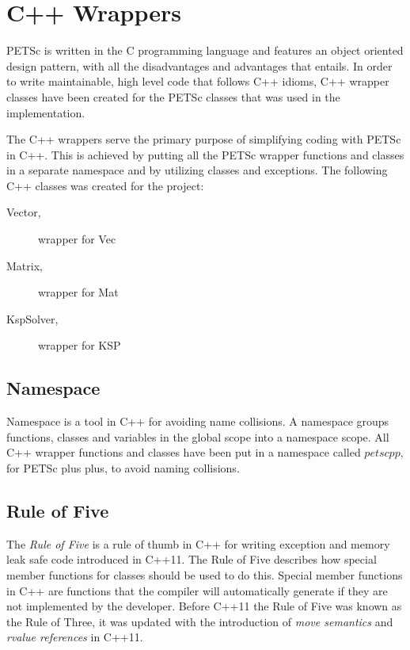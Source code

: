 \section{C++ Wrappers}

PETSc is written in the C programming language and features an object oriented
design pattern, with all the disadvantages and advantages that entails. In order
to write maintainable, high level code that follows C++ idioms, C++ wrapper
classes have been created for the PETSc classes that was used in the
implementation.

The C++ wrappers serve the primary purpose of simplifying coding with PETSc in
C++. This is achieved by putting all the PETSc wrapper functions and classes in
a separate namespace and by utilizing classes and exceptions. The following C++
classes was created for the project:
\begin{description}
	\item[Vector,] wrapper for Vec
	\item[Matrix,] wrapper for Mat
	\item[KspSolver,] wrapper for KSP
\end{description}

\subsection{Namespace}

Namespace is a tool in C++ for avoiding name collisions. A namespace groups
functions, classes and variables in the global scope into a namespace scope.
All C++ wrapper functions and classes have been put in a namespace called
$petscpp$, for PETSc plus plus, to avoid naming collisions.

\subsection{Rule of Five}

The \emph{Rule of Five} is a rule of thumb in C++ for writing exception and
memory leak safe code introduced in C++11. The Rule of Five describes how 
special member functions for classes should be used to do this. Special member
functions in C++ are functions that the compiler will automatically generate if
they are not implemented by the developer. Before C++11 the Rule of Five was
known as the Rule of Three, it was updated with the introduction of \emph{move
semantics} and \emph{rvalue references} in C++11.

